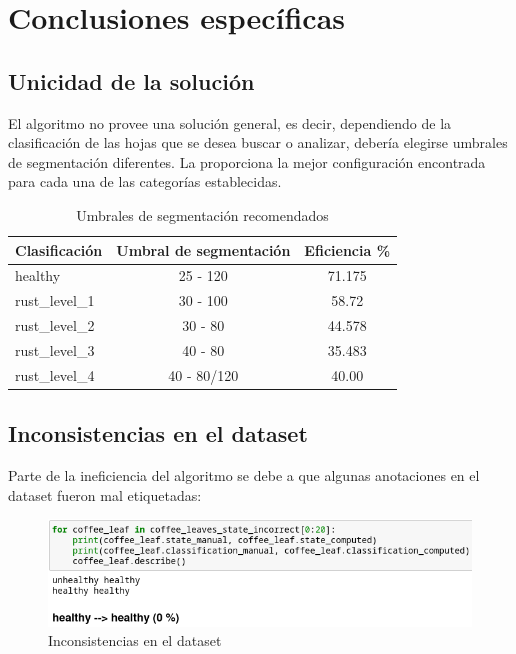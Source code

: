 \section{Conclusiones específicas}

\subsection{Unicidad de la solución}
El algoritmo no provee una solución general, es decir, dependiendo de la clasificación de las hojas que se desea buscar o analizar, debería elegirse umbrales de segmentación diferentes. La  proporciona la mejor configuración encontrada para cada una de las categorías establecidas.

\begin{table}[H]
\centering
\begin{tabular}{|l|c|c|}
\hline 
\textbf{Clasificación} & \textbf{Umbral de segmentación} & \textbf{Eficiencia \%}\\ 
\hline 
healthy & 25 - 120 & 71.175 \\ 
\hline 
rust\_level\_1 & 30 - 100 & 58.72 \\ 
\hline 
rust\_level\_2 & 30 - 80 & 44.578 \\ 
\hline 
rust\_level\_3 & 40 - 80 & 35.483 \\ 
\hline 
rust\_level\_4 & 40 - 80/120 & 40.00 \\ 
\hline 
\end{tabular}
\caption{Umbrales de segmentación recomendados}
\label{table:recommended_segmentation}
\end{table}

\subsection{Inconsistencias en el dataset}

Parte de la ineficiencia del algoritmo se debe a que algunas anotaciones en el dataset fueron mal etiquetadas:

\begin{figure}[H]
\centering
\includegraphics[width=\textwidth]{images/consideration_tag_error.png}
\caption{Inconsistencias en el dataset}
\label{img:dataset_inconsistencies}
\end{figure}

